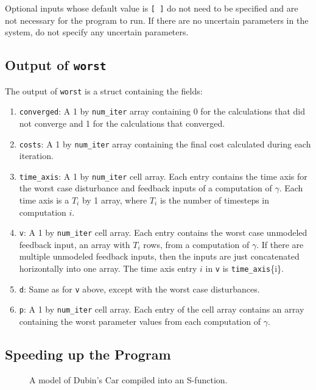 \documentclass{article}
\begin{document}
Optional inputs whose default value is \texttt{[ ]} do not need to be specified
and are not necessary for the program to run. If there are no uncertain
parameters in the system, do not specify any uncertain parameters.


\subsection{Output of \texttt{worst}}
The output of \texttt{worst} is a struct containing the fields:
\begin{enumerate}
\item \texttt{converged}: A 1 by \texttt{num\_iter} array containing 0 for the
calculations that did not converge and 1 for the calculations that converged.

\item \texttt{costs}: A 1 by \texttt{num\_iter} array containing the final cost
calculated during each iteration.

\item \texttt{time\_axis}: A 1 by \texttt{num\_iter} cell array. Each entry
contains the time axis for the worst case disturbance and feedback inputs of a
computation of $\gamma$. Each time axis is a $T_i$ by 1 array, where $T_i$ is
the number of timesteps in computation $i$.

\item \texttt{v}: A 1 by \texttt{num\_iter} cell array. Each entry contains the
worst case unmodeled feedback input, an array with $T_i$ rows, from a
computation of $\gamma$. If there are multiple unmodeled feedback inputs, then
the inputs are just concatenated horizontally into one array. The time axis
entry $i$ in \texttt{v} is \texttt{time\_axis}\{i\}.

\item \texttt{d}: Same as for \texttt{v} above, except with the worst case
disturbances.

\item \texttt{p}: A 1 by \texttt{num\_iter} cell array. Each entry of the cell
array contains an array containing the worst parameter values from each
computation of $\gamma$.
\end{enumerate}


\subsection{Speeding up the Program}

\begin{figure}
\begin{center}
\caption{A model of Dubin's Car compiled into an S-function.}
\end{center}
\label{sfunc}
\end{figure}
\end{document}
